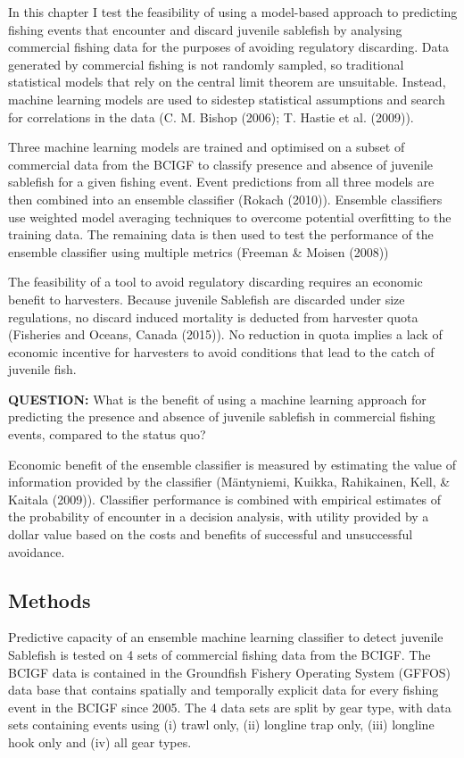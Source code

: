 \documentclass[12pt,]{scrartcl}
\begin{document}
In this chapter I test the feasibility of using a model-based approach
to predicting fishing events that encounter and discard juvenile
sablefish by analysing commercial fishing data for the purposes of
avoiding regulatory discarding. Data generated by commercial fishing is
not randomly sampled, so traditional statistical models that rely on the
central limit theorem are unsuitable. Instead, machine learning models
are used to sidestep statistical assumptions and search for correlations
in the data (C. M. Bishop (2006); T. Hastie et al. (2009)).

Three machine learning models are trained and optimised on a subset of
commercial data from the BCIGF to classify presence and absence of
juvenile sablefish for a given fishing event. Event predictions from all
three models are then combined into an ensemble classifier (Rokach
(2010)). Ensemble classifiers use weighted model averaging techniques to
overcome potential overfitting to the training data. The remaining data
is then used to test the performance of the ensemble classifier using
multiple metrics (Freeman \& Moisen (2008))

The feasibility of a tool to avoid regulatory discarding requires an
economic benefit to harvesters. Because juvenile Sablefish are discarded
under size regulations, no discard induced mortality is deducted from
harvester quota (Fisheries and Oceans, Canada (2015)). No reduction in
quota implies a lack of economic incentive for harvesters to avoid
conditions that lead to the catch of juvenile fish.

\textbf{QUESTION:} What is the benefit of using a machine learning
approach for predicting the presence and absence of juvenile sablefish
in commercial fishing events, compared to the status quo?

Economic benefit of the ensemble classifier is measured by estimating
the value of information provided by the classifier (Mäntyniemi, Kuikka,
Rahikainen, Kell, \& Kaitala (2009)). Classifier performance is combined
with empirical estimates of the probability of encounter in a decision
analysis, with utility provided by a dollar value based on the costs and
benefits of successful and unsuccessful avoidance.

\subsection{Methods}\label{methods-3}

Predictive capacity of an ensemble machine learning classifier to detect
juvenile Sablefish is tested on 4 sets of commercial fishing data from
the BCIGF. The BCIGF data is contained in the Groundfish Fishery
Operating System (GFFOS) data base that contains spatially and
temporally explicit data for every fishing event in the BCIGF since
2005. The 4 data sets are split by gear type, with data sets containing
events using (i) trawl only, (ii) longline trap only, (iii) longline
hook only and (iv) all gear types.
\end{document}
